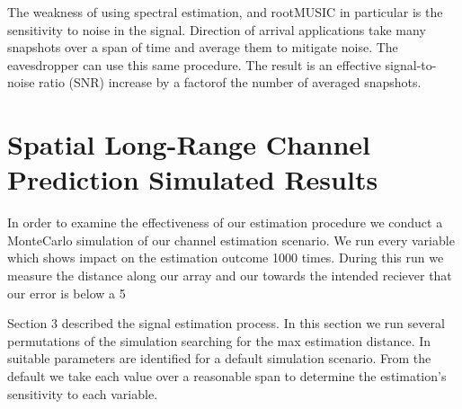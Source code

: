 \documentclass{allertonproc}
\begin{document}



The weakness of using spectral estimation, and rootMUSIC in particular is the sensitivity to noise in the signal. Direction of arrival applications take many snapshots over a span of time and average them to mitigate noise. The eavesdropper can use this same procedure. The result is an effective signal-to-noise ratio (SNR) increase by a factorof the number of averaged snapshots. 



\section{Spatial Long-Range Channel Prediction Simulated Results}\label{simresults}

In order to examine the effectiveness of our estimation procedure we conduct a MonteCarlo simulation of our channel estimation scenario. We run every variable which shows impact on the estimation outcome 1000 times. During this run we measure the distance along our array and our towards the intended reciever that our error is below a 5%

Section 3 described the signal estimation process. In this section we run several permutations of the simulation searching for the max estimation distance. In \cite{kckpVTC2015} suitable parameters are identified for a default simulation scenario.  %
From the default we take each value over a reasonable span to determine the estimation's sensitivity to each variable. 

\end{document}
